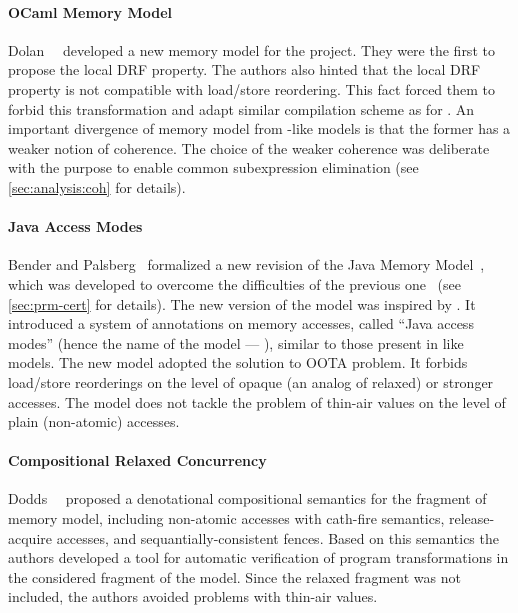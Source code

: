 \paragraph{OCaml Memory Model}

Dolan~\etal~\cite{Dolan-al:PLDI18} developed a new 
memory model for the \MOCaml project. 
They were the first to propose the local DRF property. 
The authors also hinted that the local DRF property 
is not compatible with load/store reordering.
This fact forced them to forbid this transformation
and adapt similar compilation scheme as for \RCMM. 
An important divergence of \OCaml memory model 
from \CMM-like models is that the former 
has a weaker notion of coherence.
The choice of the weaker coherence was deliberate 
with the purpose to enable common subexpression elimination
(see \cref{sec:analysis:coh} for details).

\paragraph{Java Access Modes}

Bender and Palsberg~\cite{Bender-Palsberg:OOPSLA19} formalized a new revision 
of the Java Memory Model~\cite{JDK9-VarHandle, JEP:193, JDK9-Modes}, 
which was developed to overcome 
the difficulties of the previous one~\cite{Manson-al:POPL05}
(see \ref{sec:prm-cert} for details).
The new version of the model was inspired by \RCMM. 
It introduced a system of annotations on memory accesses, 
called ``Java access modes'' (hence the name of the model --- \JAM),
similar to those present in \CMM like models.
The new model adopted the \RCMM solution to OOTA problem. 
It forbids load/store reorderings on the level of 
opaque (an analog of \CPP relaxed) or stronger accesses.
The model does not tackle the problem of 
thin-air values on the level of plain (\ie non-atomic) accesses.

\paragraph{Compositional Relaxed Concurrency}

Dodds~\etal~\cite{Dodds-al:ESOP18} proposed a denotational 
compositional semantics for the fragment of \CMM memory model, 
including non-atomic accesses with cath-fire semantics, 
release-acquire accesses, and sequantially-consistent fences. 
Based on this semantics the authors developed 
a tool for automatic verification of program transformations
in the considered fragment of the \CMM model. 
Since the relaxed fragment was not included, 
the authors avoided problems with thin-air values. 

